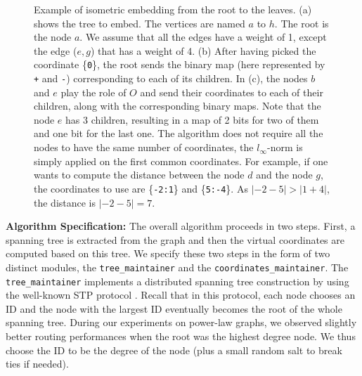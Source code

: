 \documentclass[conference]{IEEEtran}
\begin{document}
\begin{figure}
\vspace{0.1in}
\centering
{}\hfil
{}\hfil
{}
\caption{Example of isometric embedding from the root to the leaves. (a) shows the tree to embed. 
The vertices are named $a$ to $h$. The root is the node $a$. We assume that all the edges have a weight of 1, except the edge ($e,g$) that has a weight of 4. (b) After having picked the coordinate \{\texttt{0}\}, the root sends the binary map (here represented by \texttt{+} and \texttt{-}) corresponding to each of its children. In (c), the nodes $b$ and $e$ play the role of $O$ and send their coordinates to each of their children, along with the corresponding binary maps. Note that the node $e$ has 3 children, resulting in a map of 2 bits for two of them and one bit for the last one. The algorithm does not require all the nodes to have the same number of coordinates, the $l_\infty$-norm is simply applied on the first common coordinates. For example, if one wants to compute the distance between the node $d$ and the node $g$, the coordinates to use are \{\texttt{-2:1}\} and \{\texttt{5:-4}\}. As $\lvert -2-5 \rvert > \lvert 1+4\rvert$, the distance is $\lvert -2-5 \rvert = 7$.}
\vspace{-1.2em}
\label{fig:example}
\end{figure}


\textbf{Algorithm Specification: }
The overall algorithm proceeds in two steps. First, a spanning tree is extracted from the graph and then the virtual coordinates are computed based on this tree. We specify these two steps in the form of two distinct modules, the \texttt{tree\_maintainer} and the \texttt{coordinates\_maintainer}. The \texttt{tree\_maintainer} implements a distributed spanning tree construction by using the well-known STP protocol \cite{perlman:stp}. Recall that in this protocol, each node chooses an ID and the node with the largest ID eventually becomes the root of the whole spanning tree. 
During our experiments on power-law graphs, we observed slightly better routing performances when the root was the highest degree node. We thus choose the ID to be the degree of the node (plus a small random salt to break ties if needed).
 
\end{document}
